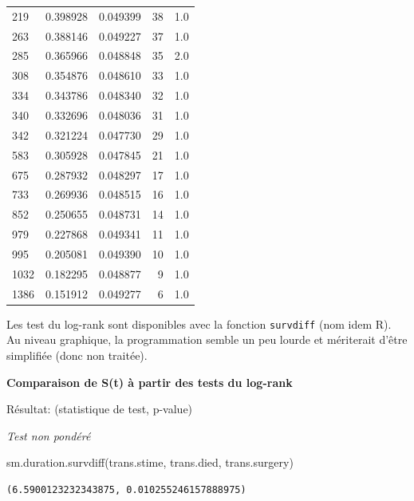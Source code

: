 \documentclass[
  12pt,
  letterpaper,
  DIV=11,
  numbers=noendperiod,
  onepage,
  openany]{scrreprt}
\newenvironment{Shaded}{\begin{snugshade}}{\end{snugshade}}
\newcommand{\NormalTok}[1]{\textcolor[rgb]{0.80,0.80,0.80}{#1}}
\begin{document}
\begin{tabular}{lrrrr}
219  &   0.398928 &      0.049399 &           38 &         1.0 \\
263  &   0.388146 &      0.049227 &           37 &         1.0 \\
285  &   0.365966 &      0.048848 &           35 &         2.0 \\
308  &   0.354876 &      0.048610 &           33 &         1.0 \\
334  &   0.343786 &      0.048340 &           32 &         1.0 \\
340  &   0.332696 &      0.048036 &           31 &         1.0 \\
342  &   0.321224 &      0.047730 &           29 &         1.0 \\
583  &   0.305928 &      0.047845 &           21 &         1.0 \\
675  &   0.287932 &      0.048297 &           17 &         1.0 \\
733  &   0.269936 &      0.048515 &           16 &         1.0 \\
852  &   0.250655 &      0.048731 &           14 &         1.0 \\
979  &   0.227868 &      0.049341 &           11 &         1.0 \\
995  &   0.205081 &      0.049390 &           10 &         1.0 \\
1032 &   0.182295 &      0.048877 &            9 &         1.0 \\
1386 &   0.151912 &      0.049277 &            6 &         1.0 \\
\bottomrule
\end{tabular}

Les test du log-rank sont disponibles avec la fonction \texttt{survdiff}
(nom idem R). Au niveau graphique, la programmation semble un peu lourde
et mériterait d'être simplifiée (donc non traitée).

\textbf{Comparaison de S(t) à partir des tests du log-rank}

Résultat: (statistique de test, p-value)

\emph{Test non pondéré}

\begin{Shaded}
\begin{Highlighting}[]
\NormalTok{sm.duration.survdiff(trans.stime, trans.died, trans.surgery)}
\end{Highlighting}
\end{Shaded}

\begin{verbatim}
(6.5900123232343875, 0.010255246157888975)
\end{verbatim}
\end{document}
